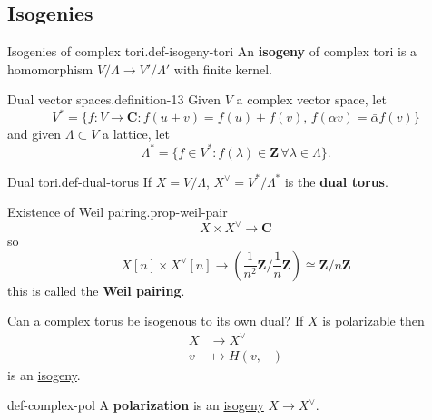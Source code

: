 \documentclass[10pt,]{book}
\newcommand{\terminology}[1]{\textbf{#1}}
\numberwithin{equation}{section}
\newcommand{\ZZ}{\mathbf{Z}}
\newcommand{\CC}{\mathbf{C}}
\newcommand{\amp}{&}
\begin{document}
\subsection[{Isogenies}]{Isogenies}\label{subsection-7}
\begin{definition}{Isogenies of complex tori.}{def-isogeny-tori}%
\hypertarget{p-76}{}%
An \terminology{isogeny} of complex tori is a homomorphism \(V/\Lambda \to V'/\Lambda'\) with finite kernel.%
\end{definition}
\begin{definition}{Dual vector spaces.}{definition-13}%
\hypertarget{p-77}{}%
Given \(V\) a complex vector space, let%
\begin{equation*}
V^* = \{f\colon V\to \CC : f(u+v) = f(u)+f(v),\,f(\alpha v) = \bar \alpha f(v) \}
\end{equation*}
and given \(\Lambda \subset V\) a lattice, let%
\begin{equation*}
\Lambda^* = \{f\in V^* : f(\lambda) \in \ZZ\,\forall \lambda\in \Lambda\}\text{.}
\end{equation*}
%
\end{definition}
\begin{definition}{Dual tori.}{def-dual-torus}%
\hypertarget{p-78}{}%
If \(X = V/\Lambda\), \(X^\vee = V^*/ \Lambda^*\) is the \terminology{dual torus}.%
\end{definition}
\begin{proposition}{Existence of Weil pairing.}{}{prop-weil-pair}%
\hypertarget{p-79}{}%
%
\begin{equation*}
X\times X^\vee \to \CC
\end{equation*}
so%
\begin{equation*}
X[n] \times X^\vee[n] \to \left(\frac{1}{n^2} \ZZ/\frac{1}{n} \ZZ\right) \cong \ZZ/n\ZZ
\end{equation*}
this is called the \terminology{Weil pairing}.%
\end{proposition}
\hypertarget{p-80}{}%
Can a \hyperref[def-complex-torus]{complex torus} be isogenous to its own dual? If \(X\) is \hyperref[def-polarizable]{polarizable} then%
\begin{align*}
X \amp\to X^\vee\\
v\amp\mapsto H(v,-)
\end{align*}
is an \hyperref[def-supersing-isog-isog]{isogeny}.%
\begin{definition}{}{def-complex-pol}%
\hypertarget{p-81}{}%
A \terminology{polarization} is an \hyperref[def-supersing-isog-isog]{isogeny} \(X \to X^\vee\).%
\end{definition}
%
%
\typeout{************************************************}
\typeout{************************************************}
%
\end{document}
